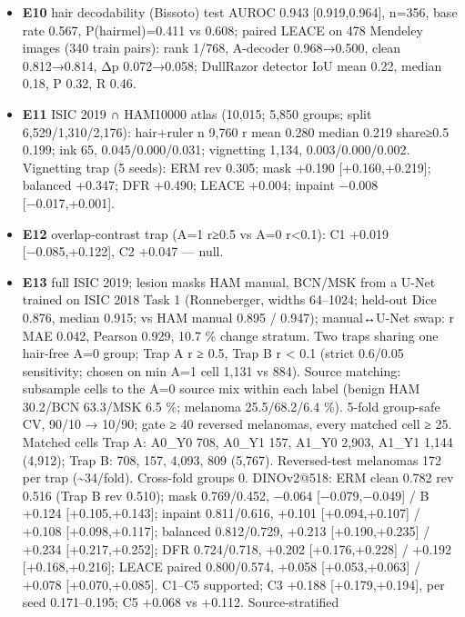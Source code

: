 {\begin{itemize}
  \textbf{E9} bridge at 100 \%: LEACE +0.294, balanced +0.281, DFR +0.279, inpaint +0.244, GroupDRO +0.197, ERM 0.515,
  mask −0.128.
\item
  \textbf{E10} hair decodability (Bissoto) test AUROC 0.943 {[}0.919,0.964{]}, n=356, base rate 0.567, P(hair\textbar mel)=0.411
  vs 0.608; paired LEACE on 478 Mendeley images (340 train pairs): rank 1/768, A-decoder 0.968→0.500, clean
  0.812→0.814, \textbar Δp\textbar{} 0.072→0.058; DullRazor detector IoU mean 0.22, median 0.18, P 0.32, R 0.46.
\item
  \textbf{E11} ISIC 2019 ∩ HAM10000 atlas (10,015; 5,850 groups; split 6,529/1,310/2,176): hair+ruler n 9,760
  r mean 0.280 median 0.219 share≥0.5 0.199; ink 65, 0.045/0.000/0.031; vignetting 1,134, 0.003/0.000/0.002.
  Vignetting trap (5 seeds): ERM rev 0.305; mask +0.190 {[}+0.160,+0.219{]}; balanced +0.347; DFR +0.490;
  LEACE +0.004; inpaint −0.008 {[}−0.017,+0.001{]}.
\item
  \textbf{E12} overlap-contrast trap (A=1 r≥0.5 vs A=0 r\textless0.1): C1 +0.019 {[}−0.085,+0.122{]}, C2 +0.047 --- null.
\item
  \textbf{E13} full ISIC 2019; lesion masks HAM manual, BCN/MSK from a U-Net trained on ISIC 2018 Task 1
  (Ronneberger, widths 64--1024; held-out Dice 0.876, median 0.915; vs HAM manual 0.895 / 0.947); manual↔U-Net
  swap: r MAE 0.042, Pearson 0.929, 10.7 \% change stratum. Two traps sharing one hair-free A=0 group; Trap A
  r ≥ 0.5, Trap B r \textless{} 0.1 (strict 0.6/0.05 sensitivity; chosen on min A=1 cell 1,131 vs 884). Source matching:
  subsample cells to the A=0 source mix within each label (benign HAM 30.2/BCN 63.3/MSK 6.5 \%; melanoma
  25.5/68.2/6.4 \%). 5-fold group-safe CV, 90/10 → 10/90; gate ≥ 40 reversed melanomas, every matched cell ≥ 25.
  Matched cells Trap A: A0\_Y0 708, A0\_Y1 157, A1\_Y0 2,903, A1\_Y1 1,144 (4,912); Trap B: 708, 157, 4,093, 809
  (5,767). Reversed-test melanomas 172 per trap (\textasciitilde34/fold). Cross-fold groups 0.
  DINOv2@518: ERM clean 0.782 rev 0.516 (Trap B rev 0.510); mask 0.769/0.452, −0.064 {[}−0.079,−0.049{]} / B +0.124
  {[}+0.105,+0.143{]}; inpaint 0.811/0.616, +0.101 {[}+0.094,+0.107{]} / +0.108 {[}+0.098,+0.117{]}; balanced 0.812/0.729,
  +0.213 {[}+0.190,+0.235{]} / +0.234 {[}+0.217,+0.252{]}; DFR 0.724/0.718, +0.202 {[}+0.176,+0.228{]} / +0.192
  {[}+0.168,+0.216{]}; LEACE paired 0.800/0.574, +0.058 {[}+0.053,+0.063{]} / +0.078 {[}+0.070,+0.085{]}.
  C1--C5 supported; C3 +0.188 {[}+0.179,+0.194{]}, per seed 0.171--0.195; C5 +0.068 vs +0.112. Source-stratified

\end{itemize}}
